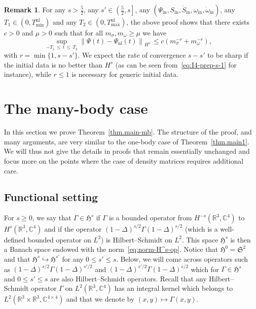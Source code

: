 \documentclass[10pt]{amsart}
\theoremstyle{definition}\newtheorem{defi}[theo]{Definition}\newtheorem{rema}[theo]{Remark}\newtheorem{exam}[theo]{Example}\newtheorem{exem}[theo]{Example}\newtheorem{nota}[theo]{Notation}
\newcommand{\rmin}{\mathrm{in}}
\newcommand{\nl}{\mathrm{nl}}
\newcommand\R{\mathbb{R}}
\newcommand\C{\mathbb{C}}
\renewcommand\le{\leqslant}
\newcommand{\gS}{\mathfrak{S}}
\newcommand{\gH}{\mathfrak{H}}
\begin{document}
\begin{rema}\label{rk:rate}
For any $s>\tfrac52$, any $s'\in\left(\tfrac52,s\right]$, any $(\Psi_{\rmin},S_{\rmin}, \dot{S}_{\rmin}, \omega_{\rmin},\dot{\omega}_{\rmin})$, any $T_1\in(0,T_{\min}^{\nl})$ and any $T_2\in(0,T_{\max}^{\nl})$, the above proof shows that there exists $c>0$ and $\mu>0$ such that for all $m_\sigma,m_\omega\geq\mu$ we have
\[
\sup_{-T_1\,\leq\,t\,\leq\,T_2}\left\|\Psi(t)-\Psi_{\nl}(t)\right\|_{H^{s'}}\le c\left(m_\sigma^{-r}+m_\omega^{-r}\right),
\]
with $r=\min\{1,s-s'\}$. We expect the rate of convergence $s-s'$ to be sharp if the initial data is no better than $H^s$ (as can be seen from~\eqref{eq:I4-prep-s-1} for instance), while $r\le1$ is necessary for generic initial data.
\end{rema}

\section{The many-body case}\label{sect:many-body}

In this section we prove Theorem~\ref{thm.main-mb}. The structure of the proof, and many arguments, are very similar to the one-body case of Theorem~\ref{thm.main1}. We will thus not give the details in proofs that remain essentially unchanged and focus more on the points where the case of density matrices requires additional care.

\subsection{Functional setting}

For $s\geq 0$, we say that $\Gamma\in\gH^s$ if $\Gamma$ is a bounded operator from $H^{-s}(\R^3,\C^4)$ to $H^s(\R^3,\C^4)$ and if the operator $(1-\Delta)^{s/2}\Gamma (1-\Delta)^{s/2}$ (which is a well-defined bounded operator on $L^2$) is Hilbert--Schmidt on $L^2$. This space $\gH^s$ is then a Banach space endowed with the norm~\eqref{eq:norm-H^s-op}. Notice that $\gH^0=\gS^2$ and that $\gH^{s}\hookrightarrow \gH^{s'}$ for any $0\leq s'\leq s$. Below, we will come across operators such as $(1-\Delta)^{s/2}\Gamma(1-\Delta)^{s'/2}$ and $(1-\Delta)^{s'/2}\Gamma(1-\Delta)^{s/2}$ which for $\Gamma\in\gH^{s}$ and $0\leq s'\leq s$ are also Hilbert--Schmidt operators. Recall that any Hilbert--Schmidt operator $\Gamma$ on $L^2(\R^3,\C^4)$ has an integral kernel which belongs to $L^2(\R^3\times\R^3,\C^{4\times4})$ and that we denote by $(x,y)\mapsto\Gamma(x,y)$.
\end{document}
